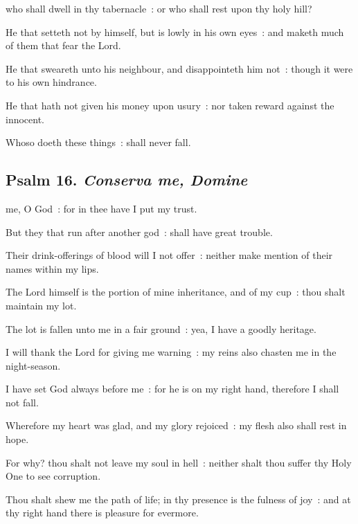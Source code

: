 
 who shall dwell in thy tabernacle~: or who shall rest upon thy holy hill?\par
{}
He that setteth not by himself, but is lowly in his own eyes~: and maketh much of them that fear the Lord.\par
{}He that sweareth unto his neighbour, and disappointeth him not~: though it were to his own hindrance.\par
{}He that hath not given his money upon usury~: nor taken reward against the innocent.\par
{}Whoso doeth these things~: shall never fall.\par

\subsection{Psalm 16. \textit{Conserva me, Domine}}


 me, O God~: for in thee have I put my trust.\par
{}
But they that run after another god~: shall have great trouble.\par
{}Their drink-offerings of blood will I not offer~: neither make mention of their names within my lips.\par
{}The Lord himself is the portion of mine inheritance, and of my cup~: thou shalt maintain my lot.\par
{}The lot is fallen unto me in a fair ground~: yea, I have a goodly heritage.\par
{}I will thank the Lord for giving me warning~: my reins also chasten me in the night-season.\par
{}I have set God always before me~: for he is on my right hand, therefore I shall not fall.\par
{}Wherefore my heart was glad, and my glory rejoiced~: my flesh also shall rest in hope.\par
{}For why? thou shalt not leave my soul in hell~: neither shalt thou suffer thy Holy One to see corruption.\par
{}Thou shalt shew me the path of life; in thy presence is the fulness of joy~: and at thy right hand there is pleasure for evermore.\par


